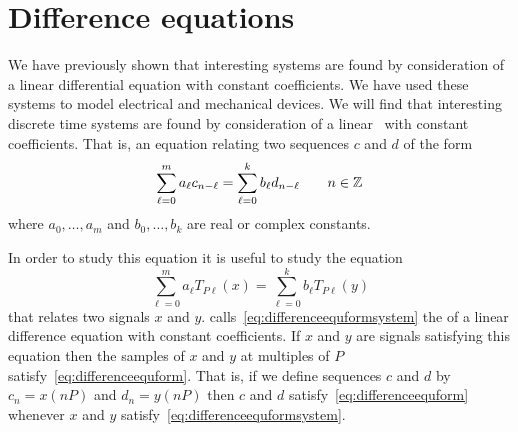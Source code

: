 \section{Difference equations}\label{sec:difference-equations}

\nocite{SolimanAndSrinath_1990}

We have previously shown that interesting systems are found by consideration of a linear differential equation with constant coefficients.  We have used these systems to model electrical and mechanical devices.  We will find that interesting discrete time systems are found by consideration of a linear~ with constant coefficients.  That is, an equation relating two sequences $c$ and $d$ of the form
\begin{equation}\label{eq:differenceequform}
\sum_{\ell=0}^{m} a_\ell c_{n - \ell} = \sum_{\ell=0}^{k} b_\ell d_{n - \ell} \qquad n \in {\mathbb Z}
\end{equation}
where $a_0,\dots,a_m$ and $b_0,\dots,b_k$ are real or complex constants.

In order to study this equation it is useful to study the equation
\begin{equation}\label{eq:differenceequformsystem}
\sum_{\ell=0}^{m} a_\ell T_{P\ell}(x) = \sum_{\ell=0}^{k} b_\ell T_{P\ell}(y)
\end{equation}
that relates two signals $x$ and $y$.  \citet[Sec.~9.5]{Zemanian_dist_theory_1965} calls~\eqref{eq:differenceequformsystem} the  of a linear difference equation with constant coefficients.  If $x$ and $y$ are signals satisfying this equation then the samples of $x$ and $y$ at multiples of $P$ satisfy~\eqref{eq:differenceequform}.  That is, if we define sequences $c$ and $d$ by $c_n = x(nP)$ and $d_n = y(nP)$ then $c$ and $d$ satisfy~\eqref{eq:differenceequform} whenever $x$ and $y$ satisfy~\eqref{eq:differenceequformsystem}.

